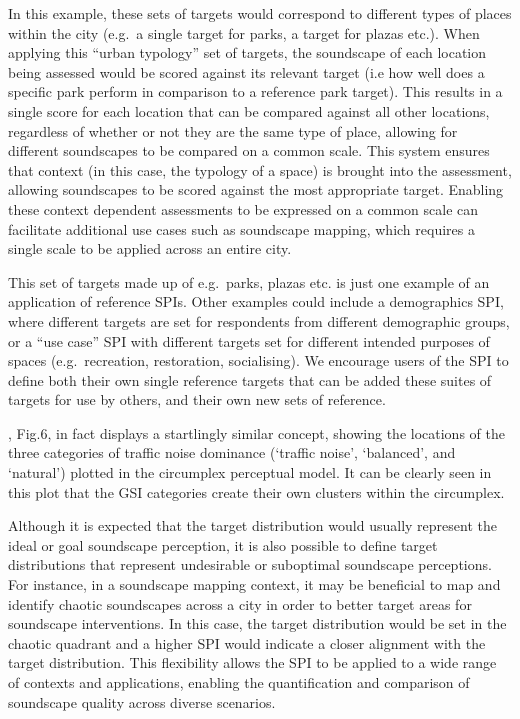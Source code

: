 \documentclass[
  authoryear,
  3p]{elsarticle}
\begin{document}
In this example, these sets of targets would correspond to different
types of places within the city (e.g.~a single target for parks, a
target for plazas etc.). When applying this ``urban typology'' set of
targets, the soundscape of each location being assessed would be scored
against its relevant target (i.e how well does a specific park perform
in comparison to a reference park target). This results in a single
score for each location that can be compared against all other
locations, regardless of whether or not they are the same type of place,
allowing for different soundscapes to be compared on a common scale.
This system ensures that context (in this case, the typology of a space)
is brought into the assessment, allowing soundscapes to be scored
against the most appropriate target. Enabling these context dependent
assessments to be expressed on a common scale can facilitate additional
use cases such as soundscape mapping, which requires a single scale to
be applied across an entire city.

This set of targets made up of e.g.~parks, plazas etc. is just one
example of an application of reference SPIs. Other examples could
include a demographics SPI, where different targets are set for
respondents from different demographic groups, or a ``use case'' SPI
with different targets set for different intended purposes of spaces
(e.g.~recreation, restoration, socialising). We encourage users of the
SPI to define both their own single reference targets that can be added
these suites of targets for use by others, and their own new sets of
reference.

\citet{Kogan2018Green}, Fig.6, in fact displays a startlingly similar
concept, showing the locations of the three categories of traffic noise
dominance (`traffic noise', `balanced', and `natural') plotted in the
circumplex perceptual model. It can be clearly seen in this plot that
the GSI categories create their own clusters within the circumplex.

Although it is expected that the target distribution would usually
represent the ideal or goal soundscape perception, it is also possible
to define target distributions that represent undesirable or suboptimal
soundscape perceptions. For instance, in a soundscape mapping context,
it may be beneficial to map and identify chaotic soundscapes across a
city in order to better target areas for soundscape interventions. In
this case, the target distribution would be set in the chaotic quadrant
and a higher SPI would indicate a closer alignment with the target
distribution. This flexibility allows the SPI to be applied to a wide
range of contexts and applications, enabling the quantification and
comparison of soundscape quality across diverse scenarios.
\end{document}
